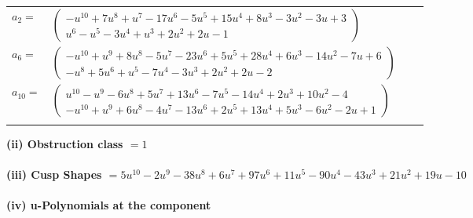 \documentclass[1p]{elsarticle_modified}
\theoremstyle{definition}
\begin{document}
\begin{tabular}{m{7pt} m{180pt} m{7pt} m{180pt} }
\flushright $a_{2}=$&$\begin{pmatrix}- u^{10}+7 u^8+u^7-17 u^6-5 u^5+15 u^4+8 u^3-3 u^2-3 u+3\\u^6- u^5-3 u^4+u^3+2 u^2+2 u-1\end{pmatrix}$ \\
\flushright $a_{6}=$&$\begin{pmatrix}- u^{10}+u^9+8 u^8-5 u^7-23 u^6+5 u^5+28 u^4+6 u^3-14 u^2-7 u+6\\- u^8+5 u^6+u^5-7 u^4-3 u^3+2 u^2+2 u-2\end{pmatrix}$ \\
\flushright $a_{10}=$&$\begin{pmatrix}u^{10}- u^9-6 u^8+5 u^7+13 u^6-7 u^5-14 u^4+2 u^3+10 u^2-4\\- u^{10}+u^9+6 u^8-4 u^7-13 u^6+2 u^5+13 u^4+5 u^3-6 u^2-2 u+1\end{pmatrix}$\\&\end{tabular}
\flushleft \textbf{(ii) Obstruction class $= 1$}\\~\\
\flushleft \textbf{(iii) Cusp Shapes $= 5 u^{10}-2 u^9-38 u^8+6 u^7+97 u^6+11 u^5-90 u^4-43 u^3+21 u^2+19 u-10$}\\~\\
\newpage\renewcommand{\arraystretch}{1}
\flushleft \textbf{(iv) u-Polynomials at the component}\newline \\
\end{document}
